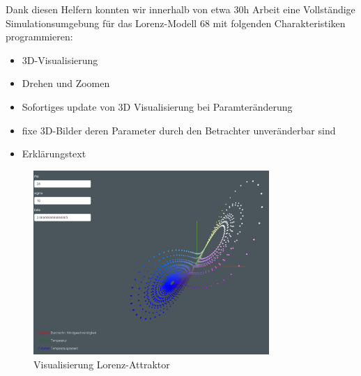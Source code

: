 Dank diesen Helfern konnten wir innerhalb von etwa 30h Arbeit eine Vollständige Simulationsumgebung für das Lorenz-Modell 68 mit folgenden Charakteristiken programmieren:

\begin{itemize}
	\item 3D-Visualisierung
	\item Drehen und Zoomen
	\item Sofortiges update von 3D Visualisierung bei Paramteränderung
	\item fixe 3D-Bilder deren Parameter durch den Betrachter unveränderbar sind
	\item Erklärungstext
\end{itemize}

\begin{figure}
	\centering	\includegraphics[height=7cm]{lorenz/assets/implementation/Visualisierung}
	\caption{Visualisierung Lorenz-Attraktor}
	\label{fig:visualisierung}
\end{figure}
